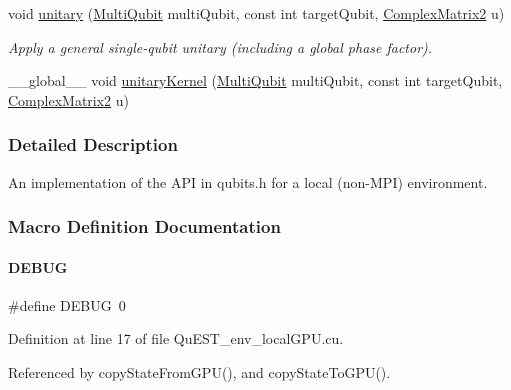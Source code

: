 \begin{DoxyCompactItemize}
void \mbox{\hyperlink{QuEST__env__localGPU_8cu_a7a0877e33700f6bad48adb51b7b3fb67}{unitary}} (\mbox{\hyperlink{structMultiQubit}{Multi\+Qubit}} multi\+Qubit, const int target\+Qubit, \mbox{\hyperlink{structComplexMatrix2}{Complex\+Matrix2}} u)
\begin{DoxyCompactList}\small\item\em Apply a general single-\/qubit unitary (including a global phase factor). \end{DoxyCompactList}\item 
\+\_\+\+\_\+global\+\_\+\+\_\+ void \mbox{\hyperlink{QuEST__env__localGPU_8cu_a266ad950d573d78d37df09828d63de17}{unitary\+Kernel}} (\mbox{\hyperlink{structMultiQubit}{Multi\+Qubit}} multi\+Qubit, const int target\+Qubit, \mbox{\hyperlink{structComplexMatrix2}{Complex\+Matrix2}} u)
\end{DoxyCompactItemize}


\subsubsection{Detailed Description}
An implementation of the A\+PI in qubits.\+h for a local (non-\/\+M\+PI) environment. 



\subsubsection{Macro Definition Documentation}
\mbox{\label{QuEST__env__localGPU_8cu_ad72dbcf6d0153db1b8d8a58001feed83}} 
\paragraph{\texorpdfstring{D\+E\+B\+UG}{DEBUG}}
{\footnotesize\ttfamily \#define D\+E\+B\+UG~0}



Definition at line 17 of file Qu\+E\+S\+T\+\_\+env\+\_\+local\+G\+P\+U.\+cu.



Referenced by copy\+State\+From\+G\+P\+U(), and copy\+State\+To\+G\+P\+U().

\mbox{\label{QuEST__env__localGPU_8cu_aa57d77a0903e334e963c66ddc5ed3f53}} 
